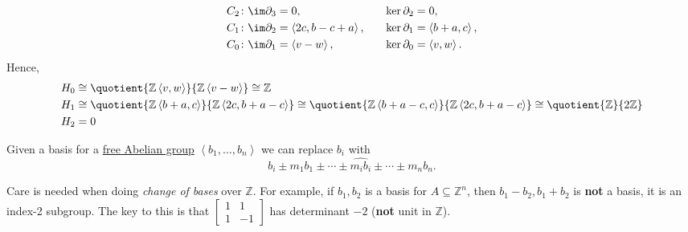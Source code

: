 \begin{explanation}
\[\begin{alignedat}{3}
			C_2 & \colon \im \partial _3 = 0,                                    & \ker \partial _2 & = 0,                      \\
			C_1 & \colon \im \partial _2 = \left< 2c, b - c + a \right> , \qquad & \ker \partial _1 & = \left< b +a, c \right>, \\
			C_0 & \colon \im \partial _1 = \left< v - w\right> ,                 & \ker \partial _0 & = \left< v, w\right>.
		\end{alignedat}
	\]
	Hence,
	\[
		\begin{split}
			H_0 & \cong \quotient{\mathbb{Z} \left< v, w \right> }{\mathbb{Z} \left< v - w \right> } \cong \mathbb{Z}                                                                                                                                 \\
			H_1 & \cong \quotient{\mathbb{Z} \left< b + a, c \right> }{\mathbb{Z} \left< 2c, b+a-c \right> } \cong \quotient{\mathbb{Z} \left< b + a - c, c \right> }{\mathbb{Z} \left< 2c, b+a-c \right> } \cong \quotient{\mathbb{Z} }{2\mathbb{Z}} \\
			H_2 & = 0                                                                                                                                                                                                                                 \\
		\end{split}
	\]
\end{explanation}

\begin{remark}
	Given a basis for a \hyperref[def:free-Abelian-group]{free Abelian group} \(\left<  b_1, \dots, b_n  \right>\) we can replace \(b_{i} \) with
	\[
		b_i \pm m_1b_1 \pm \cdots \pm \widehat{m_ib_i} \pm \cdots \pm m_n b_n.
	\]
\end{remark}

\begin{remark}
	Care is needed when doing \emph{change of bases} over \(\mathbb{Z} \). For example,
	if \(b_1, b_2\) is a basis for \(A \subseteq \mathbb{Z} ^n\), then \(b_1 - b_2, b_1 + b_2\) is \textbf{not} a basis, it is an index-2 subgroup.
	The key to this is that \(\begin{bmatrix} 1 & 1 \\ 1 & -1 \end{bmatrix}\) has determinant \(-2\) (\textbf{not} unit in \(\mathbb{Z}\)).
\end{remark}

